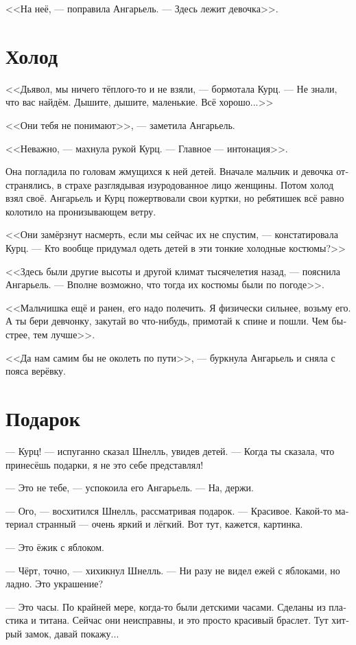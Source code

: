 \documentclass[a4paper,12pt,fleqn]{book}\usepackage{polyglossia}\setdefaultlanguage[babelshorthands=true]{russian}\setotherlanguage{english}\defaultfontfeatures{Ligatures=TeX,Mapping=tex-text}\usepackage{xcolor}\newcommand{\ml}[3]{#2}
\begin{document}
<<На неё, --- поправила Ангарьель.
--- Здесь лежит девочка>>.

\section{Холод}

<<Дьявол, мы ничего тёплого-то и не взяли, --- бормотала Курц.
--- Не знали, что вас найдём.
Дышите, дышите, маленькие.
Всё хорошо...>>

<<Они тебя не понимают>>, --- заметила Ангарьель.

<<Неважно, --- махнула рукой Курц.
--- Главное --- интонация>>.

Она погладила по головам жмущихся к ней детей.
Вначале мальчик и девочка отстранялись, в страхе разглядывая изуродованное лицо женщины.
Потом холод взял своё.
Ангарьель и Курц пожертвовали свои куртки, но ребятишек всё равно колотило на пронизывающем ветру.

<<Они замёрзнут насмерть, если мы сейчас их не спустим, --- констатировала Курц.
--- Кто вообще придумал одеть детей в эти тонкие холодные костюмы?>>

<<Здесь были другие высоты и другой климат тысячелетия назад, --- пояснила Ангарьель.
--- Вполне возможно, что тогда их костюмы были по погоде>>.

<<Мальчишка ещё и ранен, его надо полечить.
Я физически сильнее, возьму его.
А ты бери девчонку, закутай во что-нибудь, примотай к спине и пошли.
Чем быстрее, тем лучше>>.

<<Да нам самим бы не околеть по пути>>, --- буркнула Ангарьель и сняла с пояса верёвку.

\section{Подарок}

--- Курц! --- испуганно сказал Шнелль, увидев детей.
--- Когда ты сказала, что принесёшь подарки, я не это себе представлял!

--- Это не тебе, --- успокоила его Ангарьель.
--- На, держи.

--- Ого, --- восхитился Шнелль, рассматривая подарок.
--- Красивое.
Какой-то материал странный --- очень яркий и лёгкий.
Вот тут, кажется, картинка.

--- Это ёжик с яблоком.

--- Чёрт, точно, --- хихикнул Шнелль.
--- Ни разу не видел ежей с яблоками, но ладно.
Это украшение?

--- Это часы.
По крайней мере, когда-то были детскими часами.
Сделаны из пластика и титана.
Сейчас они неисправны, и это просто красивый браслет.
Тут хитрый замок, давай покажу...
\end{document}
